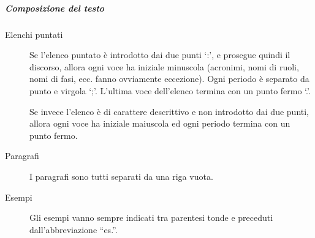 \documentclass[a4paper, titlepage]{article}
\begin{document}
\subparagraph{Composizione del testo}
\begin{description}
	\item[Elenchi puntati] 
	Se l'elenco puntato è introdotto dai due punti `:', e prosegue quindi il discorso, allora ogni voce ha iniziale minuscola (acronimi, nomi di ruoli, nomi di fasi, ecc. fanno ovviamente eccezione). Ogni periodo è separato da punto e virgola `;'. L'ultima voce dell'elenco termina con un punto fermo `.'.
	
	Se invece l'elenco è di carattere descrittivo e non introdotto dai due punti, allora ogni voce ha iniziale maiuscola ed ogni periodo termina con un punto fermo.
	\item[Paragrafi] 
	I paragrafi sono tutti separati da una riga vuota.
	\item[Esempi] 
	Gli esempi vanno sempre indicati tra parentesi tonde e preceduti dall'abbreviazione ``es.''.
\end{description}
\end{document}
